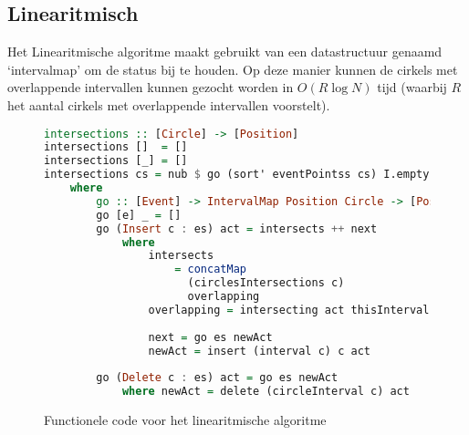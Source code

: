 \newpage
\subsection{Linearitmisch}
Het Linearitmische algoritme maakt gebruikt van een datastructuur genaamd `intervalmap' om de status bij te houden.
Op deze manier kunnen de cirkels met overlappende intervallen kunnen gezocht worden in $O(R\log N)$ tijd (waarbij $R$ het aantal cirkels met overlappende intervallen voorstelt).

\begin{figure}[H]
\begin{lstlisting}[language=Haskell]
intersections :: [Circle] -> [Position]
intersections []  = []
intersections [_] = []
intersections cs = nub $ go (sort' eventPointss cs) I.empty
    where
        go :: [Event] -> IntervalMap Position Circle -> [Position]
        go [e] _ = []
        go (Insert c : es) act = intersects ++ next
            where
                intersects 
                	= concatMap 
                	  (circlesIntersections c) 
                	  overlapping
                overlapping = intersecting act thisInterval
                
                next = go es newAct
                newAct = insert (interval c) c act
              
        go (Delete c : es) act = go es newAct
            where newAct = delete (circleInterval c) act
\end{lstlisting}
\label{imp:linearithmic}
\caption{Functionele code voor het linearitmische algoritme}
\end{figure}